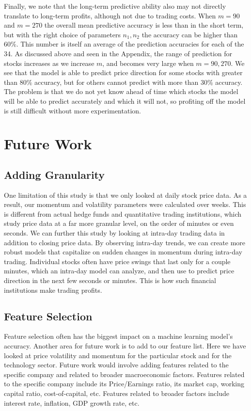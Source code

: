 \documentclass[pageno]{jpaper}
\begin{document}
Finally, we note that the long-term predictive ability also may not directly translate to long-term profits, although not due to trading costs. When $m=90$ and $m=270$ the overall mean predictive accuracy is less than in the short term, but with the right choice of parameters $n_1, n_2$ the accuracy can be higher than 60\%. This number is itself an average of the prediction accuracies for each of the 34. As discussed above and seen in the Appendix, the range of prediction for stocks increases as we increase $m$, and becomes very large when $m=90, 270$. We see that the model is able to predict price direction for some stocks with greater than 80\% accuracy, but for others cannot predict with more than 30\% accuracy. The problem is that we do not yet know ahead of time which stocks the model will be able to predict accurately and which it will not, so profiting off the model is still difficult without more experimentation.

\section{Future Work}
\subsection{Adding Granularity}
One limitation of this study is that we only looked at daily stock price data. As a result, our momentum and volatility parameters were calculated over weeks. This is different from actual hedge funds and quantitative trading institutions, which study price data at a far more granular level, on the order of minutes or even seconds. We can further this study by looking at intra-day trading data in addition to closing price data. By observing intra-day trends, we can create more robust models that capitalize on sudden changes in momentum during intra-day trading. Individual stocks often have price swings that last only for a couple minutes, which an intra-day model can analyze, and then use to predict price direction in the next few seconds or minutes. This is how such financial institutions make trading profits.

\subsection{Feature Selection}
Feature selection often has the biggest impact on a machine learning model’s accuracy. Another area for future work is to add to our feature list. Here we have looked at price volatility and momentum for the particular stock and for the technology sector. Future work would involve adding features related to the specific company and related to broader macroeconomic factors. Features related to the specific company include its Price/Earnings ratio, its market cap, working capital ratio, cost-of-capital, etc. Features related to broader factors include interest rate, inflation, GDP growth rate, etc.
\end{document}
